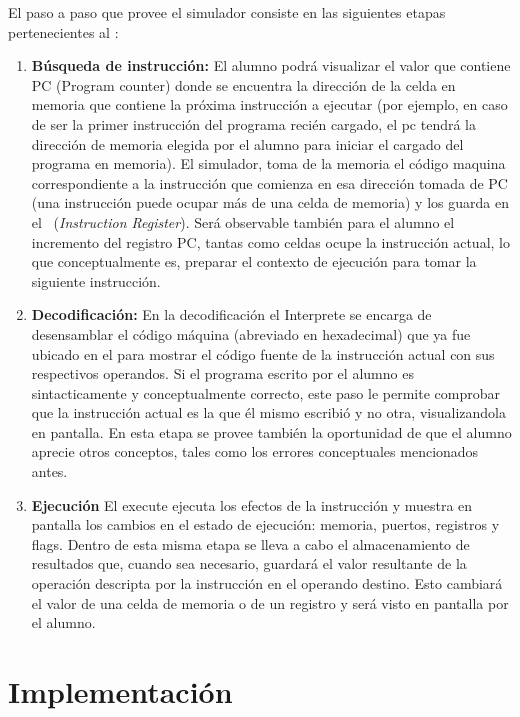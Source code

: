 El paso a paso que provee el simulador consiste en las siguientes etapas pertenecientes al \ciclo:

\begin{enumerate}
\item \textbf{Búsqueda de instrucción:} El alumno podrá visualizar el valor que contiene PC (Program counter) donde se encuentra la dirección de la celda en memoria que contiene la próxima instrucción a ejecutar (por ejemplo, en caso de ser la primer instrucción del programa recién cargado, el pc tendrá la dirección de memoria elegida por el alumno para iniciar el cargado del programa en memoria). El simulador, toma de la memoria el código maquina correspondiente a la instrucción que comienza en esa dirección tomada de PC (una instrucción puede ocupar más de una celda de memoria) y los guarda en el \IR\ (\textit{Instruction Register}). Será observable también para el alumno el incremento del registro PC, tantas como celdas ocupe la instrucción actual, lo que conceptualmente es, preparar el contexto de ejecución para tomar la siguiente instrucción.

\item  \textbf{Decodificación:}
En la decodificación el Interprete se encarga de desensamblar el código máquina (abreviado en hexadecimal) que ya fue ubicado en el \IR para mostrar el código fuente de la instrucción actual con sus respectivos operandos. Si el programa escrito por el alumno es sintacticamente y conceptualmente correcto, este paso le permite comprobar que la instrucción actual es la que él mismo escribió y no otra, visualizandola en pantalla. En esta etapa se provee también la oportunidad de que el alumno aprecie otros conceptos, tales como los errores conceptuales mencionados antes.

\item  \textbf{Ejecución}
El execute ejecuta los efectos de la instrucción y muestra en pantalla los cambios en el estado de ejecución: memoria, puertos, registros y flags. Dentro de esta misma etapa se lleva a cabo el almacenamiento de resultados que, cuando sea necesario, guardará el valor resultante de la operación descripta por la instrucción en el operando destino. Esto cambiará el valor de una celda de memoria o de un registro y será visto en pantalla por el alumno.
\end{enumerate}


\section{Implementación}

